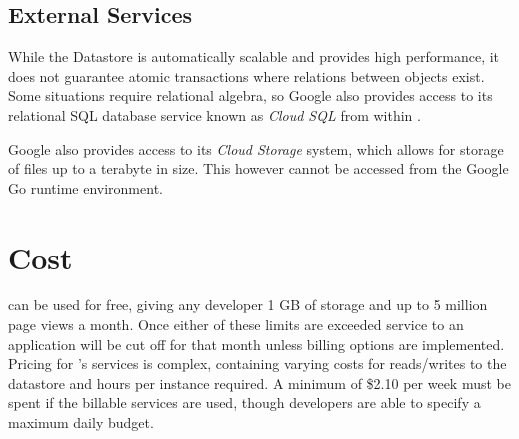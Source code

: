 \subsection{External Services}
While the Datastore is automatically scalable and provides high performance, it does not guarantee atomic transactions where relations between objects exist. Some situations require relational algebra, so Google also provides access to its relational SQL database service known as \emph{Cloud SQL} from within \gae{}\ftGAETwo. 

Google also provides access to its \emph{Cloud Storage} system, which allows for storage of files up to a terabyte in size. This however cannot be accessed from the Google Go runtime environment\ftGAETwo.

\section{Cost}
\gae{} can be used for free, giving any developer 1 GB of storage and up to 5 million page views a month. Once either of these limits are exceeded service to an application will be cut off for that month unless billing options are implemented. Pricing for \gae{}'s services is complex, containing varying costs for reads/writes to the datastore and hours per instance required. A minimum of \$2.10 per week must be spent if the billable services are used, though developers are able to specify a maximum daily budget\ftGAEFive.\ftGAEFiveText

